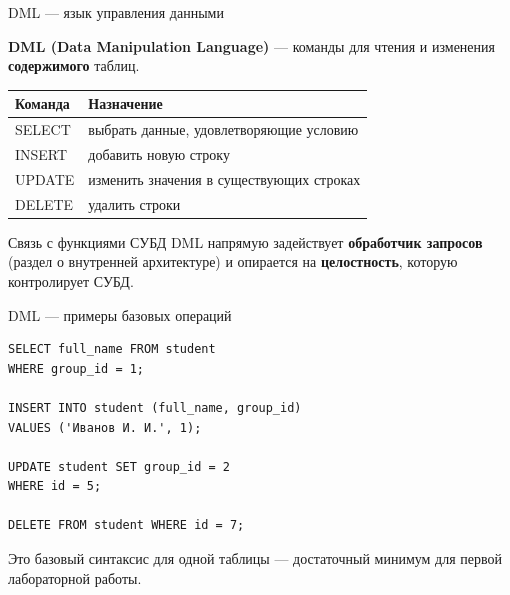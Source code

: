 \documentclass[aspectratio=169]{beamer}
\begin{document}
\begin{frame}{DML — язык управления данными}

\textbf{DML (Data Manipulation Language)} — команды для
чтения и изменения \textbf{содержимого} таблиц.

\vspace{0.3cm}

\small
\begin{table}
\centering
\begin{tabular}{>{\ttfamily}p{}|p{}}
\toprule
\textnormal{Команда} & \textnormal{Назначение}\\
\midrule
SELECT & выбрать данные, удовлетворяющие условию\\
INSERT & добавить новую строку\\
UPDATE & изменить значения в существующих строках\\
DELETE & удалить строки\\
\bottomrule
\end{tabular}
\end{table}

\vspace{0.3cm}
\normalsize
\begin{alertblock}{Связь с функциями СУБД}
DML напрямую задействует \textbf{обработчик запросов}
(раздел о внутренней архитектуре) и опирается на
\textbf{целостность}, которую контролирует СУБД.
\end{alertblock}

\end{frame}


\begin{frame}[fragile]{DML — примеры базовых операций}

\small
\begin{verbatim}
SELECT full_name FROM student
WHERE group_id = 1;

INSERT INTO student (full_name, group_id)
VALUES ('Иванов И. И.', 1);

UPDATE student SET group_id = 2
WHERE id = 5;

DELETE FROM student WHERE id = 7;
\end{verbatim}
\normalsize

\vspace{0.2cm}
\footnotesize
Это базовый синтаксис для одной таблицы — достаточный
минимум для первой лабораторной работы.

\end{frame}
\end{document}
